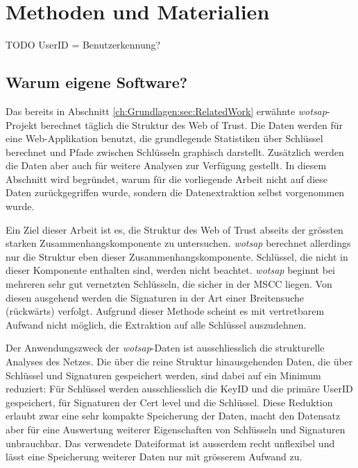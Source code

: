 
\chapter{Methoden und Materialien}
\label{ch:Methoden}

TODO UserID = Benutzerkennung?

\section{Warum eigene Software?}
\label{ch:Grundlagen:sec:WarumEigene}
Das bereits in Abschnitt \ref{ch:Grundlagen:sec:RelatedWork} erwähnte
\emph{wotsap}-Projekt berechnet täglich die Struktur des Web of
Trust. Die Daten werden für eine Web-Applikation benutzt, die
grundlegende Statistiken über Schlüssel berechnet und Pfade zwischen
Schlüsseln graphisch darstellt. Zusätzlich werden die Daten aber auch
für weitere Analysen zur Verfügung gestellt. In diesem Abschnitt wird
begründet, warum für die vorliegende Arbeit nicht auf diese Daten
zurückgegriffen wurde, sondern die Datenextraktion selbst vorgenommen
wurde.

Ein Ziel dieser Arbeit ist es, die Struktur des Web of Trust abseits
der grössten starken Zusammenhangskomponente zu
untersuchen. \emph{wotsap} berechnet allerdings nur die Struktur eben
dieser Zusammenhangskomponente. Schlüssel, die nicht in dieser
Komponente enthalten sind, werden nicht beachtet. \emph{wotsap}
beginnt bei mehreren sehr gut vernetzten Schlüsseln, die sicher in der
MSCC liegen. Von diesen ausgehend werden die Signaturen in der Art
einer Breitensuche (rückwärts) verfolgt. Aufgrund dieser Methode
scheint es mit vertretbarem Aufwand nicht möglich, die Extraktion auf
alle Schlüssel auszudehnen.

Der Anwendungszweck der \emph{wotsap}-Daten ist ausschliesslich die
strukturelle Analyses des Netzes. Die über die reine Struktur
hinausgehenden Daten, die über Schlüssel und Signaturen gespeichert
werden, sind dabei auf ein Minimum reduziert: Für Schlüssel werden
ausschliesslich die KeyID und die primäre UserID gespeichert, für
Signaturen der Cert level und die Schlüssel. Diese Reduktion erlaubt
zwar eine sehr kompakte Speicherung der Daten, macht den Datensatz
aber für eine Auswertung weiterer Eigenschaften von Schlüsseln und
Signaturen unbrauchbar. Das verwendete Dateiformat ist ausserdem recht
unflexibel und lässt eine Speicherung weiterer Daten nur mit grösserem
Aufwand zu.

